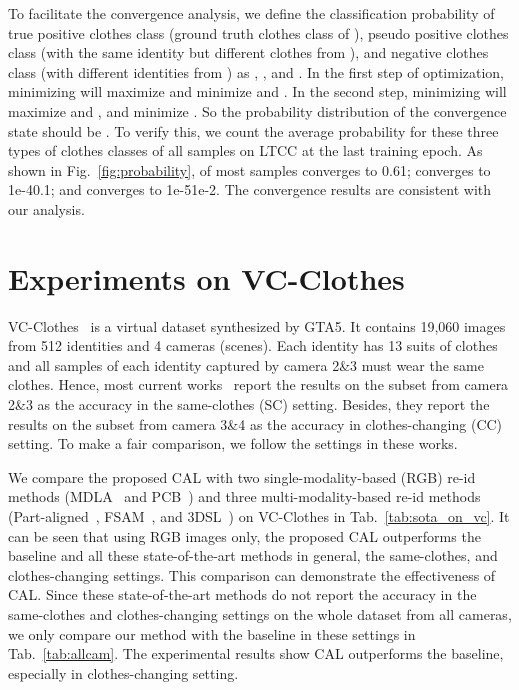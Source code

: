 \documentclass[10pt,twocolumn,letterpaper]{article}
\begin{document}
To facilitate the convergence analysis, we define the classification probability of true positive clothes class (ground truth clothes class of ), pseudo positive clothes class (with the same identity but different clothes from ), and negative clothes class (with different identities from ) as , , and .
In the first step of optimization, minimizing  will maximize  and minimize  and . 
In the second step, minimizing  will maximize  and , and minimize . 
So the probability distribution of the convergence state should be .
To verify this, we count the average probability for these three types of clothes classes of all samples on LTCC at the last training epoch.
As shown in Fig.~\ref{fig:probability},  of most samples converges to 0.61;  converges to 1e-40.1; and  converges to 1e-51e-2. The convergence results are consistent with our analysis.





\section{Experiments on VC-Clothes}

VC-Clothes~\cite{Real28} is a virtual dataset synthesized by GTA5.
It contains 19,060 images from 512 identities and 4 cameras (scenes).
Each identity has 13 suits of clothes and all samples of each identity captured by camera 2\&3 must wear the same clothes.
Hence, most current works~\cite{Real28,Hong2021Finegrained} report the results on the subset from camera 2\&3 as the accuracy in the same-clothes (SC) setting.
Besides, they report the results on the subset from camera 3\&4 as the accuracy in clothes-changing (CC) setting.
To make a fair comparison, we follow the settings in these works.

We compare the proposed CAL with two single-modality-based (RGB) re-id methods (\ie MDLA~\cite{Qian2017MS} and PCB~\cite{Sun2018Beyond}) and three multi-modality-based re-id methods (\ie Part-aligned~\cite{Suh2018Part}, FSAM~\cite{Hong2021Finegrained}, and 3DSL~\cite{Chen2021Learning3D}) on VC-Clothes in Tab.~\ref{tab:sota_on_vc}.
It can be seen that using RGB images only, the proposed CAL outperforms the baseline and all these state-of-the-art methods in general, the same-clothes, and clothes-changing settings.
This comparison can demonstrate the effectiveness of CAL.
Since these state-of-the-art methods do not report the accuracy in the same-clothes and clothes-changing settings on the whole dataset from all cameras, we only compare our method with the baseline in these settings in Tab.~\ref{tab:allcam}. The experimental results show CAL outperforms the baseline, especially in clothes-changing setting.
\end{document}
